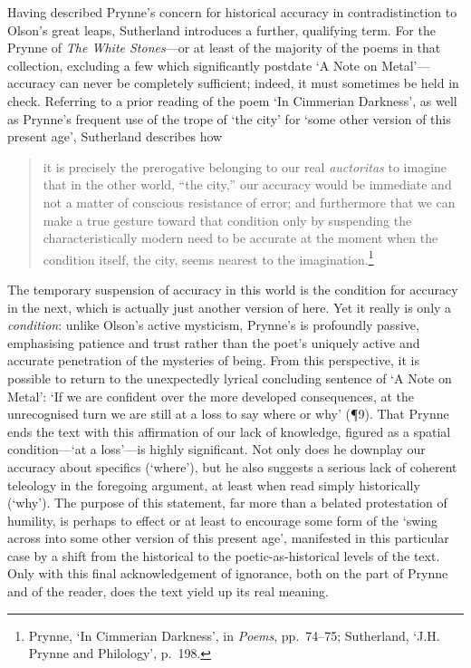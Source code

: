 \documentclass[]{article}
\begin{document}
Having described Prynne’s concern for historical accuracy in
contradistinction to Olson’s great leaps, Sutherland introduces a
further, qualifying term. For the Prynne of \emph{The White Stones}—or
at least of the majority of the poems in that collection, excluding a
few which significantly postdate ‘A Note on Metal’—accuracy can never be
completely sufficient; indeed, it must sometimes be held in check.
Referring to a prior reading of the poem ‘In Cimmerian Darkness’, as
well as Prynne’s frequent use of the trope of ‘the city’ for ‘some other
version of this \textbar{} present age’, Sutherland describes how

\begin{quote}
\singlespacing it is precisely the prerogative belonging to our real
\emph{auctoritas} to imagine that in the other world, “the city,” our
accuracy would be immediate and not a matter of conscious resistance of
error; and furthermore that we can make a true gesture toward that
condition only by suspending the characteristically modern need to be
accurate at the moment when the condition itself, the city, seems
nearest to the imagination.\footnote{Prynne, ‘In Cimmerian Darkness’, in
  \emph{Poems}, pp.~74–75; Sutherland, ‘J.H. Prynne and Philology’,
  p.~198.}
\end{quote}

\noindent The temporary suspension of accuracy in this world is the
condition for accuracy in the next, which is actually just another
version of here. Yet it really is only a \emph{condition}: unlike
Olson’s active mysticism, Prynne’s is profoundly passive, emphasising
patience and trust rather than the poet’s uniquely active and accurate
penetration of the mysteries of being. From this perspective, it is
possible to return to the unexpectedly lyrical concluding sentence of ‘A
Note on Metal’: ‘If we are confident over the more developed
consequences, at the unrecognised turn we are still at a loss to say
where or why’ (¶9). That Prynne ends the text with this affirmation of
our lack of knowledge, figured as a spatial condition—‘at a loss’—is
highly significant. Not only does he downplay our accuracy about
specifics (‘where’), but he also suggests a serious lack of coherent
teleology in the foregoing argument, at least when read simply
historically (‘why’). The purpose of this statement, far more than a
belated protestation of humility, is perhaps to effect or at least to
encourage some form of the ‘swing across into \textbar{} some other
version of this \textbar{} present age’, manifested in this particular
case by a shift from the historical to the poetic-as-historical levels
of the text. Only with this final acknowledgement of ignorance, both on
the part of Prynne and of the reader, does the text yield up its real
meaning. \newpage
\end{document}
